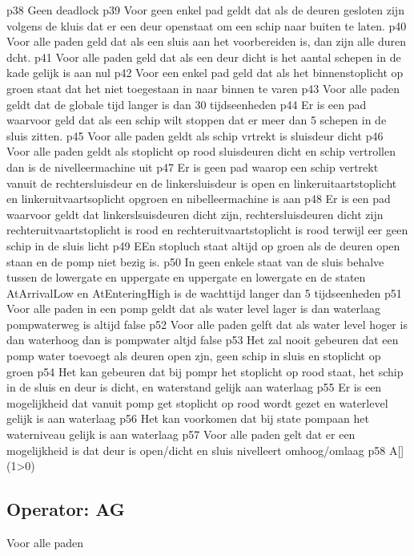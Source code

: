  p38 Geen deadlock
 p39 Voor geen enkel pad geldt dat als  de deuren gesloten zijn volgens de kluis dat er een deur openstaat om een schip naar buiten te laten.
 p40 Voor alle paden geld dat als een sluis aan het voorbereiden is, dan zijn alle duren dcht.
 p41 Voor alle paden geld dat als een deur dicht is het aantal schepen in de kade gelijk is aan nul	
 p42 Voor een enkel pad geld dat als het binnenstoplicht op groen staat dat het niet toegestaan in naar binnen te varen
 p43 Voor alle paden geldt dat de globale tijd langer is dan 30 tijdseenheden
 p44 Er is een pad waarvoor geld dat als een schip wilt stoppen dat er meer dan 5 schepen in de sluis zitten.
 p45 Voor alle paden geldt als schip vrtrekt is sluisdeur dicht
 p46 Voor alle paden geldt als stoplicht op rood sluisdeuren dicht en schip vertrollen dan is de nivelleermachine uit
 p47 Er is geen pad waarop een schip vertrekt vanuit de rechtersluisdeur en de linkersluisdeur is open en linkeruitaartstoplicht en linkeruitvaartsoplicht opgroen  en nibelleermachine is aan
 p48 Er is een pad waarvoor geldt dat linkerslsuisdeuren dicht zijn, rechtersluisdeuren dicht zijn rechteruitvaartstoplicht is rood en rechteruitvaartstoplicht is  rood terwijl eer geen schip in de sluis licht
 p49 EEn stopluch staat altijd op groen als de deuren open staan en de pomp niet bezig is.
 p50 In geen enkele staat van de sluis behalve tussen de lowergate en uppergate en uppergate en lowergate en de staten AtArrivalLow en AtEnteringHigh is de wachttijd langer dan 5 tijdseenheden
 p51 Voor alle paden in een pomp geldt dat als water level lager is dan waterlaag pompwaterweg is altijd false
 p52 Voor alle paden gelft dat als water level hoger is dan waterhoog dan is pompwater altjd false
 p53 Het zal nooit gebeuren dat een pomp water toevoegt als deuren open zjn, geen schip in sluis en stoplicht op groen
 p54 Het kan gebeuren dat bij pompr het stoplicht op rood staat, het schip in de sluis en deur is dicht, en waterstand gelijk aan waterlaag
 p55 Er is een mogelijkheid  dat vanuit pomp get stoplicht op rood wordt gezet en waterlevel gelijk is aan waterlaag
 p56 Het kan voorkomen dat bij state pompaan het waterniveau gelijk is aan waterlaag
 p57 Voor alle paden gelt dat er een mogelijkheid is dat deur is open/dicht en sluis nivelleert omhoog/omlaag
 p58 A[](1>0)
 
 
 
 
 \subsection{Operator: AG}
 Voor alle paden
 
